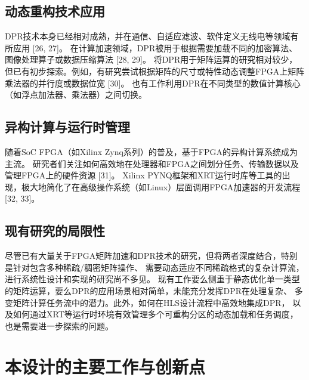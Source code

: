 \subsection{动态重构技术应用}

DPR技术本身已经相对成熟，并在通信、自适应滤波、软件定义无线电等领域有所应用 [26, 27]。
在计算加速领域，DPR被用于根据需要加载不同的加密算法、图像处理算子或数据压缩算法 [28, 29]。
将DPR用于矩阵运算的研究相对较少，但已有初步探索。例如，有研究尝试根据矩阵的尺寸或特性动态调整FPGA上矩阵乘法器的并行度或数据位宽 [30]。
也有工作利用DPR在不同类型的数值计算核心（如浮点加法器、乘法器）之间切换。

\subsection{异构计算与运行时管理}

随着SoC FPGA（如Xilinx Zynq系列）的普及，基于FPGA的异构计算系统成为主流。
研究者们关注如何高效地在处理器和FPGA之间划分任务、传输数据以及管理FPGA上的硬件资源 [31]。
Xilinx PYNQ框架和XRT运行时库等工具的出现，极大地简化了在高级操作系统（如Linux）层面调用FPGA加速器的开发流程 [32, 33]。

\subsection{现有研究的局限性}

尽管已有大量关于FPGA矩阵加速和DPR技术的研究，但将两者深度结合，特别是针对包含多种稀疏/稠密矩阵操作、
需要动态适应不同稀疏格式的复杂计算流，进行系统性设计和实现的研究尚不多见。
现有工作要么侧重于静态优化单一类型的矩阵运算，要么DPR的应用场景相对简单，未能充分发挥DPR在处理复杂、
多变矩阵计算任务流中的潜力。此外，如何在HLS设计流程中高效地集成DPR，
以及如何通过XRT等运行时环境有效管理多个可重构分区的动态加载和任务调度，也是需要进一步探索的问题。

\section{本设计的主要工作与创新点}

